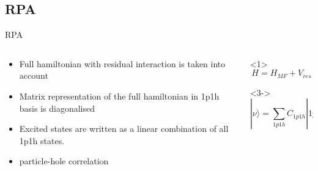 \documentclass[pdf]{beamer}
\begin{document}
        \subsection{RPA}
            \begin{frame}{RPA}{}
                \begin{columns}
                    \begin{column}[]{0.7\textwidth}
                        \begin{itemize}
                            \item<1->Full hamiltonian with residual interaction is taken into account
                            \item<2->Matrix representation of the full hamiltonian in 1p1h basis is diagonalised
                            \item<3->Excited states are written as a linear combination of all 1p1h states.
                            \item<4->particle-hole correlation
                        \end{itemize}
                    \end{column}
                    \begin{column}[]{0.3\textwidth}
                        \begin{onlyenv}<1>
                            \begin{equation*}
                                H = H_{MF} + V_{res}
                            \end{equation*}
                        \end{onlyenv}
                        \begin{onlyenv}<3->
                            \begin{equation*}
                                |\nu\rangle = \sum_{1p1h}C_{1p1h}|1p1h\rangle
                            \end{equation*}
                        \end{onlyenv}
                    \end{column}
                \end{columns}
            \end{frame}
\end{document}

